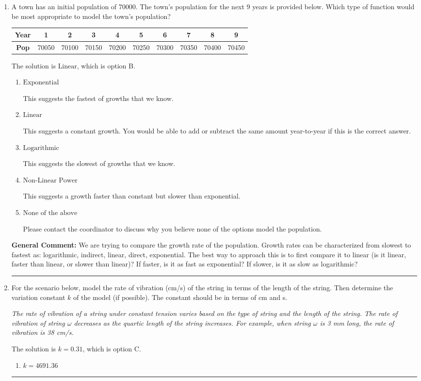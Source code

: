 \documentclass{extbook}[14pt]
\newcommand{\litem}[1]{\item #1

\rule{\textwidth}{0.4pt}}
\begin{document}
\begin{enumerate}\litem{
A town has an initial population of 70000. The town's population for the next 9 years is provided below. Which type of function would be most appropriate to model the town's population?


\begin{tabular}{c|c|c|c|c|c|c|c|c|c}
\textbf{Year} &1 &2 &3 &4 &5 &6 &7 &8 &9\tabularnewline \hline
\textbf{Pop} &70050 &70100 &70150 &70200 &70250 &70300 &70350 &70400 &70450\end{tabular}The solution is \( \text{Linear} \), which is option B.\begin{enumerate}[label=\Alph*.]
\item \( \text{Exponential} \)

This suggests the fastest of growths that we know.
\item \( \text{Linear} \)

This suggests a constant growth. You would be able to add or subtract the same amount year-to-year if this is the correct answer.
\item \( \text{Logarithmic} \)

This suggests the slowest of growths that we know.
\item \( \text{Non-Linear Power} \)

This suggests a growth faster than constant but slower than exponential.
\item \( \text{None of the above} \)

Please contact the coordinator to discuss why you believe none of the options model the population.
\end{enumerate}

\textbf{General Comment:} We are trying to compare the growth rate of the population. Growth rates can be characterized from slowest to fastest as: logarithmic, indirect, linear, direct, exponential. The best way to approach this is to first compare it to linear (is it linear, faster than linear, or slower than linear)? If faster, is it as fast as exponential? If slower, is it as slow as logarithmic?
}
\litem{
For the scenario below, model the rate of vibration (cm/s) of the string in terms of the length of the string. Then determine the variation constant $k$ of the model (if possible). The constant should be in terms of cm and s.

\begin{center}
    \textit{ The rate of vibration of a string under constant tension varies based on the type of string and the length of the string. The rate of vibration of string $\omega$ decreases as the quartic length of the string increases. For example, when string $\omega$ is 3 mm long, the rate of vibration is 38 cm/s. }
\end{center}
The solution is \( k = 0.31 \), which is option C.\begin{enumerate}[label=\Alph*.]
\item \( k = 4691.36 \)


\end{enumerate}}
\end{enumerate}
\end{document}
